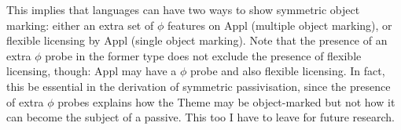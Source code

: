 \documentclass[output=paper
,modfonts
,nonflat]{langsci/langscibook}
\begin{document}
\citep{Van_der_Wal2017a}
% 


This implies that languages can have two ways to show symmetric object marking: either an extra set of $\phi$ features on Appl (multiple object marking), or flexible licensing by Appl (single object marking). Note that the presence of an extra $\phi$ probe in the former type does not exclude the presence of flexible licensing, though: Appl may have a $\phi$ probe and also flexible licensing. In fact, this be essential in the derivation of symmetric passivisation, since the presence of extra $\phi$ probes explains how the Theme may be object-marked but not how it can become the subject of a passive. This too I have to leave for future research.
\end{document}

